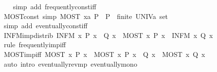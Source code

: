 \begin{isabellebody}
%
\isadelimproof
\ \ %
\endisadelimproof
%
\isatagproof
{}\isamarkupfalse%
\ {\isacharparenleft}simp\ add{\isacharcolon}\ frequently{\isacharunderscore}const{\isacharunderscore}iff{\isacharparenright}%
\endisatagproof
{\isafoldproof}%
%
\isadelimproof
\isanewline
%
\endisadelimproof
\isanewline
{}\isamarkupfalse%
\ MOST{\isacharunderscore}const\ {\isacharbrackleft}simp{\isacharbrackright}{\isacharcolon}\ {\isachardoublequoteopen}{\isacharparenleft}MOST\ x{\isacharcolon}{\isacharcolon}{\isacharprime}a{\isachardot}\ P{\isacharparenright}\ {\isasymlongleftrightarrow}\ P\ {\isasymor}\ finite\ {\isacharparenleft}UNIV{\isacharcolon}{\isacharcolon}{\isacharprime}a\ set{\isacharparenright}{\isachardoublequoteclose}\isanewline
%
\isadelimproof
\ \ %
\endisadelimproof
%
\isatagproof
{}\isamarkupfalse%
\ {\isacharparenleft}simp\ add{\isacharcolon}\ eventually{\isacharunderscore}const{\isacharunderscore}iff{\isacharparenright}%
\endisatagproof
{\isafoldproof}%
%
\isadelimproof
\isanewline
%
\endisadelimproof
\isanewline
{}\isamarkupfalse%
\ INFM{\isacharunderscore}imp{\isacharunderscore}distrib{\isacharcolon}\ {\isachardoublequoteopen}{\isacharparenleft}INFM\ x{\isachardot}\ P\ x\ {\isasymlongrightarrow}\ Q\ x{\isacharparenright}\ {\isasymlongleftrightarrow}\ {\isacharparenleft}{\isacharparenleft}MOST\ x{\isachardot}\ P\ x{\isacharparenright}\ {\isasymlongrightarrow}\ {\isacharparenleft}INFM\ x{\isachardot}\ Q\ x{\isacharparenright}{\isacharparenright}{\isachardoublequoteclose}\isanewline
%
\isadelimproof
\ \ %
\endisadelimproof
%
\isatagproof
{}\isamarkupfalse%
\ {\isacharparenleft}rule\ frequently{\isacharunderscore}imp{\isacharunderscore}iff{\isacharparenright}%
\endisatagproof
{\isafoldproof}%
%
\isadelimproof
\isanewline
%
\endisadelimproof
\isanewline
{}\isamarkupfalse%
\ MOST{\isacharunderscore}imp{\isacharunderscore}iff{\isacharcolon}\ {\isachardoublequoteopen}MOST\ x{\isachardot}\ P\ x\ {\isasymLongrightarrow}\ {\isacharparenleft}MOST\ x{\isachardot}\ P\ x\ {\isasymlongrightarrow}\ Q\ x{\isacharparenright}\ {\isasymlongleftrightarrow}\ {\isacharparenleft}MOST\ x{\isachardot}\ Q\ x{\isacharparenright}{\isachardoublequoteclose}\isanewline
%
\isadelimproof
\ \ %
\endisadelimproof
%
\isatagproof
{}\isamarkupfalse%
\ {\isacharparenleft}auto\ intro{\isacharcolon}\ eventually{\isacharunderscore}rev{\isacharunderscore}mp\ eventually{\isacharunderscore}mono{\isacharparenright}%
\endisatagproof
{\isafoldproof}%
%
\isadelimproof
\isanewline
%
\endisadelimproof
\isanewline

\end{isabellebody}
